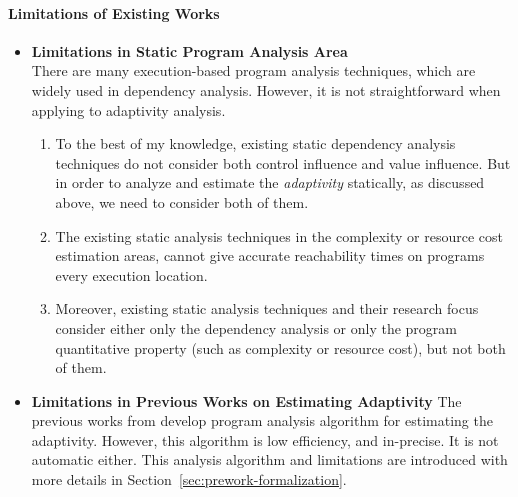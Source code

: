 \paragraph{Limitations of Existing Works}
\begin{itemize}
   \item \textbf{Limitations in Static Program Analysis Area}
   \\
      There are many execution-based program analysis techniques, which are widely used in  dependency analysis. 
      However, it is not straightforward when applying to adaptivity analysis.
      \begin{enumerate}
      \item To the best of my knowledge,
      existing static dependency analysis techniques do not consider both control influence and value influence.
      But in order to analyze and estimate the \emph{adaptivity} statically, as discussed above, we need to consider both of them.
      \item The existing static analysis techniques in the complexity or resource cost estimation areas,
      cannot give accurate reachability times on programs 
      every execution location.
      \item Moreover, existing static analysis techniques and their research focus consider
      either only the dependency analysis
      or only the program quantitative property (such as complexity or resource cost),
      but not both of them.
      \end{enumerate}
\item \textbf{Limitations in Previous Works on Estimating Adaptivity}
The previous works from 
develop program analysis algorithm for estimating the adaptivity.
However, this algorithm is low efficiency, and in-precise. It is not automatic either. 
This analysis algorithm and limitations are introduced with more details in Section~\ref{sec:prework-formalization}.
\end{itemize}

